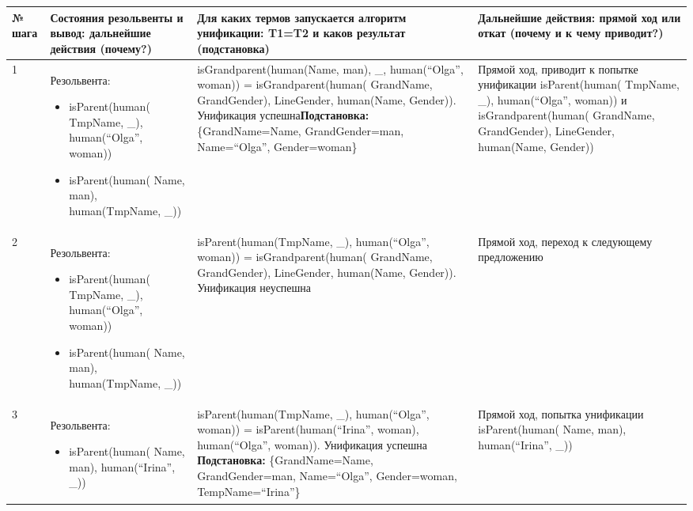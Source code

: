 \documentclass[14pt,a4paper]{scrreprt}
\begin{document}
\begin{table}[H]
	\begin{tabular}{|p{0.8cm\small}|p{4.7cm\small}|p{5.7cm\small}|p{4cm\small}|}	
		\hline
		№ шага & Состояния резольвенты и вывод: дальнейшие действия (почему?) & Для каких термов запускается алгоритм унификации: T1=T2 и каков результат (подстановка) & Дальнейшие действия: прямой ход или откат (почему и к чему приводит?)\\
		\hline
		1 & Резольвента:\begin{itemize}
			\item isParent(human(
		TmpName, \_), human(``Olga'', woman)) \item isParent(human(
		Name, man), human(TmpName, \_))\end{itemize} & isGrandparent(human(Name, man), \_, human(``Olga'', woman)) = isGrandparent(human(
		GrandName, GrandGender), LineGender, human(Name, Gender)). Унификация успешна\linebreak \textbf{Подстановка:} \{GrandName=Name, GrandGender=man, Name=``Olga'', Gender=woman\} & Прямой ход, приводит к попытке унификации isParent(human(
		TmpName, \_), human(``Olga'', woman)) и isGrandparent(human(
		GrandName, GrandGender), LineGender, human(Name, Gender))\\
		\hline 
		2 & Резольвента:\begin{itemize} \item isParent(human(
			TmpName, \_), human(``Olga'', woman)) \item isParent(human(
			Name, man), human(TmpName, \_))\end{itemize} & isParent(human(TmpName, \_), human(``Olga'', woman)) = isGrandparent(human(
		GrandName, GrandGender), LineGender, human(Name, Gender)). Унификация неуспешна & Прямой ход, переход к следующему предложению\\
		\hline
		3 & Резольвента:\begin{itemize} \item isParent(human(
			Name, man), human(``Irina'', \_))\end{itemize} & isParent(human(TmpName, \_), human(``Olga'', woman)) = isParent(human(``Irina'', woman), human(``Olga'', woman)). Унификация успешна\linebreak
		\textbf{Подстановка:} \{GrandName=Name, GrandGender=man, Name=``Olga'', Gender=woman, TempName=``Irina''\} & Прямой ход, попытка унификации isParent(human(
		Name, man), human(``Irina'', \_))\\
		\hline
	\end{tabular}
\end{table}
\end{document}
